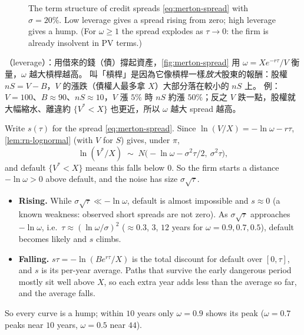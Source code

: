 \begin{figure}[H]
	\caption{The term structure of credit spreads \eqref{eq:merton-spread} with
		$\sigma=20\%$. Low leverage gives a spread rising from zero; high leverage
		gives a hump. (For $\omega\ge1$ the spread explodes as $\tau\to0$: the firm is
		already insolvent in PV terms.)}
	\label{fig:merton-spread}
\end{figure}


\begin{remark}
	（leverage）：用借來的錢（債）撐起資產，\autoref{fig:merton-spread} 用 $\omega=Xe^{-r\tau}/V$ 衡量，$\omega$ 越大槓桿越高。
	叫「槓桿」是因為它像槓桿一樣\emph{放大}股東的報酬：股權 $nS=V-B$，$V$ 的漲跌（債權人最多拿 $X$）大部分落在較小的 $nS$ 上。
	例：$V=100$、$B\approx90$、$nS\approx10$，$V$ 漲 $5\%$ 時 $nS$ 約漲 $50\%$；反之 $V$ 跌一點，股權就大幅縮水、離違約 $\{V^{*}<X\}$ 也更近，所以 $\omega$ 越大 spread 越高。
\end{remark}

\begin{intuition}
	Write $s(\tau)$ for the spread \eqref{eq:merton-spread}.
	Since $\ln(V/X)=-\ln\omega-r\tau$, \autoref{lem:rn-lognormal} (with $V$ for $S$) gives, under $\pi$,
	\[
		\ln(V^{*}/X)\;\sim\;N\bigl(-\ln\omega-\sigma^{2}\tau/2,\ \sigma^{2}\tau\bigr) ,
	\]
	and default $\{V^{*}<X\}$ means this falls below $0$.
	So the firm starts a distance $-\ln\omega>0$ above default, and the noise has size $\sigma\sqrt{\tau}$.
	\begin{itemize}[nosep]
		\item \textbf{Rising.} While $\sigma\sqrt{\tau}\ll-\ln\omega$, default is almost impossible and $s\approx0$ (a known weakness: observed short spreads are not zero).
		      As $\sigma\sqrt{\tau}$ approaches $-\ln\omega$, i.e.\ $\tau\approx(\ln\omega/\sigma)^{2}$ ($\approx0.3$, $3$, $12$ years for $\omega=0.9,0.7,0.5$), default becomes likely and $s$ climbs.
		\item \textbf{Falling.} $s\tau=-\ln(Be^{r\tau}/X)$ is the total discount for default over $[0,\tau]$, and $s$ is its per-year average.
		      Paths that survive the early dangerous period mostly sit well above $X$, so each extra year adds less than the average so far, and the average falls.
	\end{itemize}
	So every curve is a hump; within $10$ years only $\omega=0.9$ shows its peak ($\omega=0.7$ peaks near $10$ years, $\omega=0.5$ near $44$).
\end{intuition}

